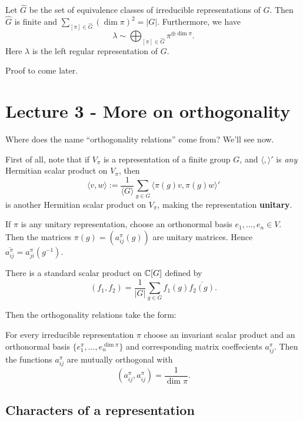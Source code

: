 \documentclass[11pt, english]{article}
\begin{document}
\begin{thm}
Let $\hat G$ be the set of equivalence classes of irreducible representations of $G$. Then $\hat G$ is finite and $\sum_{[\pi] \in \hat G} (\dim \pi)^2 = \lvert G \rvert$. Furthermore, we have
$$
\lambda \sim  \bigoplus_{[\pi] \in \hat G} \pi^{\oplus \dim \pi}.
$$
Here $\lambda$ is the left regular representation of $G$.
\end{thm}
Proof to come later.






\newpage
\section{Lecture 3 - More on orthogonality}

Where does the name ``orthogonality relations'' come from? We'll see now.

First of all, note that if $V_\pi$ is a representation of a finite group $G$, and $\langle,\rangle'$ is \emph{any} Hermitian scalar product on $V_\pi$, then 
$$
\langle v, w \rangle := \frac{1}{\langle G \rangle} \sum_{g \in G} \langle \pi(g) v, \pi(g) w \rangle'
$$
is another Hermitian scalar product on $V_\pi$, making the representation \textbf{unitary}.

If $\pi$ is any unitary representation, choose an orthonormal basis $e_1,\ldots,e_n \in V$. Then the matrices $\pi(g) = \left( a_{ij}^\pi(g) \right)$ are unitary matrices. Hence $\overline{a_{ij}^\pi} = a_{ji}^\pi(g^{-1})$.

There is a standard scalar product on $\mathbb{C}[G]$ defined by
$$
(f_1,f_2) = \frac 1{\lvert G \rvert} \sum_{g \in G} f_1(g) \overline{f_2(g)}.
$$

Then the orthogonality relations take the form:

\begin{thm}
 For every irreducible representation $\pi$ choose an invariant scalar product and an orthonormal basis $\{e_1^\pi, \ldots, e_n^{\dim \pi}\}$ and corresponding matrix coeffecients $a_{ij}^\pi$. Then the functions $a_{ij}^\pi$ are mutually orthogonal with
$$
\left (a_{ij}^\pi, a_{ij}^\pi\right) = \frac{1}{\dim \pi}.
$$
\end{thm}

\subsection{Characters of a representation}
\end{document}
